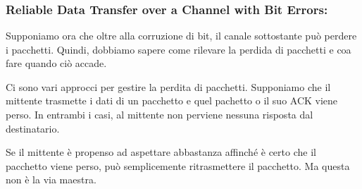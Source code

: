 \documentclass{book}
\newcommand{\tmtextit}[1]{\text{{\itshape{#1}}}}
\begin{document}
\

\

\

\subsubsection{Reliable Data Transfer over a Channel with Bit Errors:
\tmtextit{rdt3.0}}

{}

Supponiamo ora che oltre alla corruzione di bit, il canale sottostante pu{\`o}
perdere i pacchetti. Quindi, dobbiamo sapere come rilevare la perdida di
pacchetti e coa fare quando ci{\`o} accade.

Ci sono vari approcci per gestire la perdita di pacchetti. Supponiamo che il
mittente trasmette i dati di un pacchetto e quel pachetto o il suo ACK viene
perso. In entrambi i casi, al mittente non perviene nessuna risposta dal
destinatario.

Se il mittente {\`e} propenso ad aspettare abbastanza affinch{\'e} {\`e}
certo che il pacchetto viene perso, pu{\`o} semplicemente ritrasmettere il
pacchetto. Ma questa non {\`e} la via maestra.
\end{document}
